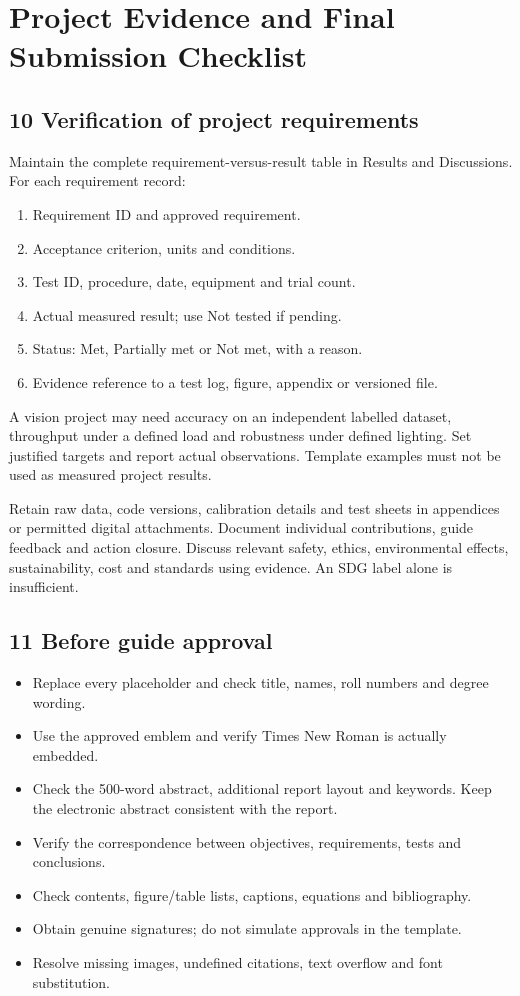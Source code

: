 \documentclass[11pt,a4paper]{article}
\newcommand{\Page}[1]{\clearpage\section*{#1}}
\begin{document}
\Page{Project Evidence and Final Submission Checklist}
\subsection*{10 Verification of project requirements}
Maintain the complete requirement-versus-result table in Results and Discussions.
For each requirement record:
\begin{enumerate}
\item Requirement ID and approved requirement.
\item Acceptance criterion, units and conditions.
\item Test ID, procedure, date, equipment and trial count.
\item Actual measured result; use Not tested if pending.
\item Status: Met, Partially met or Not met, with a reason.
\item Evidence reference to a test log, figure, appendix or versioned file.
\end{enumerate}
A vision project may need accuracy on an independent labelled dataset, throughput
under a defined load and robustness under defined lighting. Set justified targets
and report actual observations. Template examples must not be used as measured
project results.

Retain raw data, code versions, calibration details and test sheets in appendices
or permitted digital attachments. Document individual contributions, guide
feedback and action closure. Discuss relevant safety, ethics, environmental
effects, sustainability, cost and standards using evidence. An SDG label alone
is insufficient.

\subsection*{11 Before guide approval}
\begin{itemize}
\item Replace every placeholder and check title, names, roll numbers and degree wording.
\item Use the approved emblem and verify Times New Roman is actually embedded.
\item Check the 500-word abstract, additional report layout and keywords. Keep the
electronic abstract consistent with the report.
\item Verify the correspondence between objectives, requirements, tests and conclusions.
\item Check contents, figure/table lists, captions, equations and bibliography.
\item Obtain genuine signatures; do not simulate approvals in the template.
\item Resolve missing images, undefined citations, text overflow and font substitution.
\end{itemize}
\end{document}
